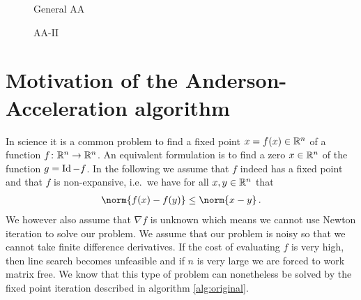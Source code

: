 \begin{figure}[b]
\centering
\begin{minipage}{0.41\textwidth}
\begin{algorithm}[H]
\caption{General AA}
\label{alg:aai}


\BlankLine
{}
\end{algorithm}
\end{minipage}
\hfill
\begin{minipage}{0.58\textwidth}
\begin{algorithm}[H]
\caption{AA-II}
\label{alg:aa2}

\BlankLine
{}
\end{algorithm}
\end{minipage}
\end{figure}


\section{Motivation of the Anderson-Acceleration algorithm}

In science it is a common problem to find a fixed point $x=f(x)\in\mathbb{R}^n$ of a function $f\colon\mathbb{R}^n\to\mathbb{R}^n$. An equivalent formulation is to find a zero $x\in\mathbb{R}^n$ of the function $g=\operatorname{Id}-f$. In the following we assume that $f$ indeed has a fixed point and that $f$ is non-expansive, i.e.\ we have for all $x,y\in\mathbb{R}^n$ that
\begin{align*}
	\norm{f(x)-f(y)}\leq\norm{x-y}\,.
\end{align*}
We however also assume that $\nabla f$ is unknown which means we cannot use Newton iteration to solve our problem. We assume that our problem is noisy so that we cannot take finite difference derivatives. If the cost of evaluating $f$ is very high, then line search becomes unfeasible and if $n$ is very large we are forced to work matrix free. We know that this type of problem can nonetheless be solved by the fixed point iteration described in algorithm \ref{alg:original}.

